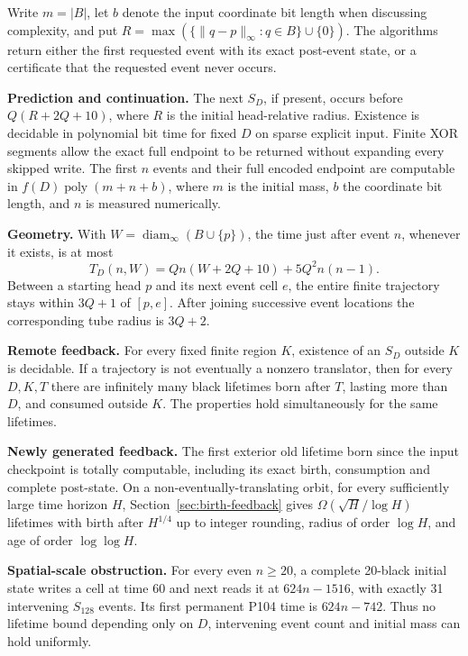 \documentclass[
  11pt,
]{article}
\begin{document}
Write $m=|B|$, let $b$ denote the input coordinate bit length when discussing
complexity, and put $R=\max(\{\|q-p\|_\infty:q\in B\}\cup\{0\})$.
The algorithms return either the first requested event with its exact
post-event state, or a certificate that the requested event never occurs.

\textbf{Prediction and continuation.} The next \(S_D\), if present,
occurs before \(Q(R+2Q+10)\), where \(R\) is the initial head-relative
radius. Existence is decidable in polynomial bit time for fixed \(D\) on
sparse explicit input. Finite XOR segments allow the exact full endpoint
to be returned without expanding every skipped write. The first \(n\)
events and their full encoded endpoint are computable in
\(f(D)\operatorname{poly}(m+n+b)\), where \(m\) is the initial mass,
\(b\) the coordinate bit length, and \(n\) is measured numerically.

\textbf{Geometry.} With \(W=\operatorname{diam}_\infty(B\cup\{p\})\),
the time just after event \(n\), whenever it exists, is at most
\begin{equation}\label{eq:event-budget}
T_D(n,W)=Qn(W+2Q+10)+5Q^2n(n-1).
\end{equation} Between a starting head \(p\) and
its next event cell \(e\), the entire finite trajectory stays within
\(3Q+1\) of \([p,e]\). After joining successive event locations the
corresponding tube radius is \(3Q+2\).

\textbf{Remote feedback.} For every fixed finite region \(K\), existence
of an \(S_D\) outside \(K\) is decidable. If a trajectory is not
eventually a nonzero translator, then for every \(D,K,T\) there are
infinitely many black lifetimes born after \(T\), lasting more than
\(D\), and consumed outside \(K\). The properties hold simultaneously
for the same lifetimes.

\textbf{Newly generated feedback.} The first exterior old lifetime born
since the input checkpoint is totally computable, including its exact birth,
consumption and complete post-state. On a non-eventually-translating orbit,
for every sufficiently large time horizon $H$,
Section~\ref{sec:birth-feedback} gives
\(\Omega(\sqrt H/\log H)\) lifetimes with birth after \(H^{1/4}\) up to
integer rounding, radius of order \(\log H\), and age of order
\(\log\log H\).

\textbf{Spatial-scale obstruction.} For every even \(n\ge20\), a
complete 20-black initial state writes a cell at time 60 and next reads
it at \(624n-1516\), with exactly 31 intervening \(S_{128}\) events. Its
first permanent P104 time is \(624n-742\). Thus no lifetime bound
depending only on \(D\), intervening event count and initial mass can
hold uniformly.
\end{document}
